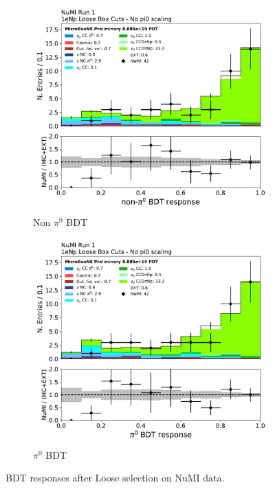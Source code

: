 \begin{figure}[H]
    \centering
    \begin{subfigure}{0.4\textwidth}
    \includegraphics[width=1.0\textwidth]{Sidebands/Figures/NuMI/1eNp/nonpi0_score.pdf}
    \caption{Non $\pi^0$ BDT}
    \end{subfigure}
    \begin{subfigure}{0.4\textwidth}
    \includegraphics[width=1.0\textwidth]{Sidebands/Figures/NuMI/1eNp/pi0_score.pdf}
    \caption{$\pi^0$ BDT}
    \end{subfigure}
    \caption{BDT responses after \npsel Loose selection on NuMI data.} 
    \label{fig:NuMI_1eNp_7}
\end{figure}



